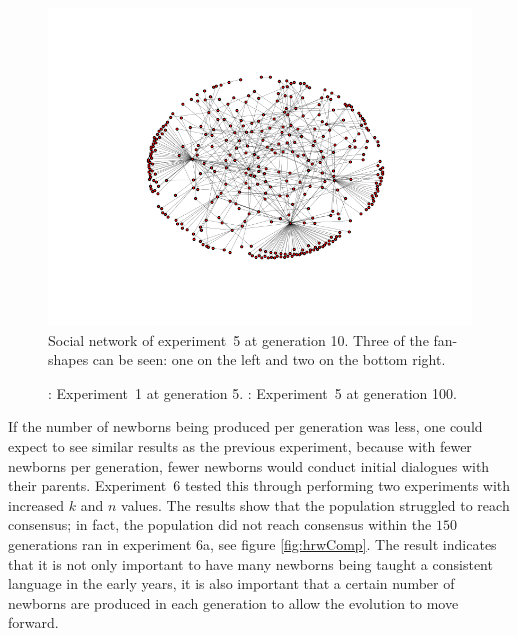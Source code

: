 \begin{figure}
    \centering
    \includegraphics[width=0.49\linewidth]{fig/Results/Exp5/_graph10}
    \caption{Social network of experiment~5 at generation 10. Three of the fan-shapes can be seen: one on the left and two on the bottom right.}
    \label{exp5SN10}
\end{figure}
\begin{figure}
    \centering
    \hfill
    \caption{: Experiment~1 at generation 5. : Experiment~5 at generation 100.}
    \label{fig:SNComparison}
\end{figure}

If the number of newborns being produced per generation was less, one could expect to see similar results as the previous experiment, because with fewer newborns per generation, fewer newborns would conduct initial dialogues with their parents. Experiment~6 tested this through performing two experiments with increased $k$ and $n$ values. The results show that the population struggled to reach consensus; in fact, the population did not reach consensus within the $150$ generations ran in experiment 6a, see figure \ref{fig:hrwComp}. The result indicates that it is not only important to have many newborns being taught a consistent language in the early years, it is also important that a certain number of newborns are produced in each generation to allow the evolution to move forward. 

